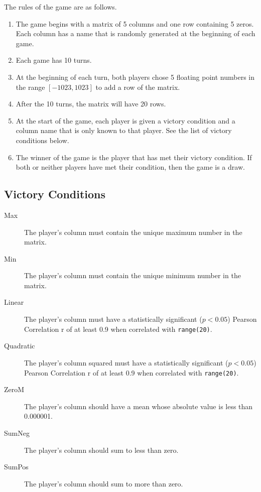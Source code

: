 \documentclass{article}
\begin{document}
The rules of the game are as follows.
\begin{enumerate}
    \item The game begins with a matrix of 5 columns and one row containing 5 zeros.
          Each column has a name that is randomly
          generated at the beginning of each game.
    \item Each game has 10 turns.
    \item At the beginning of each turn, both players chose 5 floating point numbers in the range $[-1023, 1023]$
          to add a row of the matrix.
    \item After the 10 turns, the matrix will have 20 rows.
    \item At the start of the game, each player is given a victory condition and a column name 
          that is only known to that player. See the list of victory conditions below.
    \item The winner of the game is the player that
has met their victory condition. If both or neither players have met their
condition, then the game is a draw.
\end{enumerate}

\subsection*{Victory Conditions}
\begin{description}
    \item[Max] The player's column must contain the unique maximum number in the matrix.
    \item[Min] The player's column must contain the unique minimum number in the matrix.
    \item[Linear] The player's column must have a statistically significant ($p < 0.05$) 
                  Pearson Correlation r of at least 0.9 when correlated with {\tt range(20)}.
    \item[Quadratic] The player's column squared must have a statistically significant ($p < 0.05$) 
                  Pearson Correlation r of at least 0.9 when correlated with {\tt range(20)}.
    \item[ZeroM] The player's column should have a mean whose absolute value is less than 0.000001.
    \item[SumNeg] The player's column should sum to less than zero.
    \item[SumPos] The player's column should sum to more than zero.
\end{description}
\end{document}
